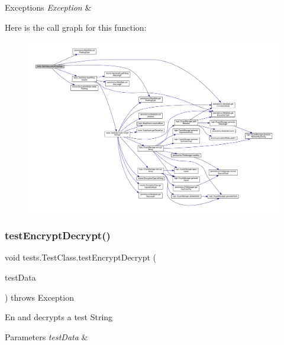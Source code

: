 \begin{DoxyExceptions}{Exceptions}
{\em Exception} & \\
\hline
\end{DoxyExceptions}
Here is the call graph for this function\+:
\nopagebreak
\begin{figure}[H]
\begin{center}
\leavevmode
\includegraphics[width=350pt]{classtests_1_1_test_class_ad9f19e80ff161cfedfbfe4ba527c0074_cgraph}
\end{center}
\end{figure}
\mbox{\label{classtests_1_1_test_class_a11145228e7254b6763247dcdb84d1805}} 
\subsubsection{\texorpdfstring{test\+Encrypt\+Decrypt()}{testEncryptDecrypt()}}
{\footnotesize\ttfamily void tests.\+Test\+Class.\+test\+Encrypt\+Decrypt (\begin{DoxyParamCaption}\item[{\mbox{\hyperlink{classpersistence_1_1_meta_data}{Meta\+Data}}}]{test\+Data }\end{DoxyParamCaption}) throws Exception}

En and decrypts a test String 
\begin{DoxyParams}{Parameters}
{\em test\+Data} & \\
\hline
\end{DoxyParams}

